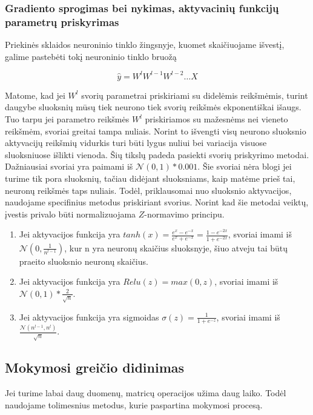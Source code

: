 \documentclass[a4paper, 12pt]{article}
\begin{document}
%
\subsubsection{Gradiento sprogimas bei nykimas, aktyvacinių funkcijų parametrų priskyrimas}
%
\label{Gradiento sprogimas}
Priekinės sklaidos neuroninio tinklo žingsnyje, kuomet skaičiuojame išvestį, galime pastebėti tokį neuroninio tinklo bruožą

\begin{equation}
\hat{y}=W^{l}  W^{l-1}  W^{l-2}  \ldots  X
\end{equation}

Matome, kad jei $W^l$ svorių parametrai priskiriami su didelėmis reikšmėmis, turint daugybe sluoksnių mūsų tiek neurono tiek svorių reikšmės ekponentiškai išaugs. Tuo tarpu jei parametro reikšmės $W^l$ priskiriamos su mažesnėms nei vieneto reikšmėm, svoriai greitai tampa nuliais. Norint to išvengti visų neurono sluoksnio aktyvacijų reikšmių vidurkis turi būti lygus nuliui bei variacija visuose sluoksniuose išlikti vienoda. Šių tikslų padeda pasiekti svorių priskyrimo metodai. Dažniausiai svoriai yra paimami iš $\mathcal{N}(0,1)\ast0.001$. Šie svoriai nėra blogi jei turime tik pora sluoksnių, tačiau didėjant sluoksniams, kaip matėme prieš tai, neuronų reikšmės taps nuliais. Todėl, priklausomai nuo sluoksnio aktyvacijos, naudojame specifinius metodus priskiriant svorius. Norint kad šie metodai veiktų, įvestis privalo būti normalizuojama $Z$-normavimo principu. 

\begin{enumerate}
  \addtolength{\itemsep}{-0.5\baselineskip} 
  \item 	Jei aktyvacijos funkcija yra $tanh(x) = \frac{e^x - e^{-x}}{e^x + e^{-x}} = \frac{1 - e^{-2x}}{1 + e^{-2x}}$, svoriai imami iš $\mathcal{N}(0,\frac{1}{n^{l-1}})$, kur n yra neuronų skaičius sluoksnyje, šiuo atveju tai būtų praeito sluoksnio neuronų skaičius.
  \item 	Jei aktyvacijos funkcija yra $Relu(z) = max(0, z)$, svoriai imami iš $\mathcal{N}(0,1)\ast\frac{2}{\sqrt n}$.
  \item 	Jei aktyvacijos funkcija yra sigmoidas $\sigma(z) = \frac{1} {1 + e^{-z}}$, svoriai imami iš $\frac{\mathcal{N}(n^{l-1},n^l)}{\sqrt n}$.
\end{enumerate}

%
\subsection{Mokymosi greičio didinimas }
%
Jei turime labai daug duomenų, matricų operacijos užima daug laiko. Todėl naudojame tolimesnius metodus, kurie paspartina mokymosi procesą.
\end{document}
